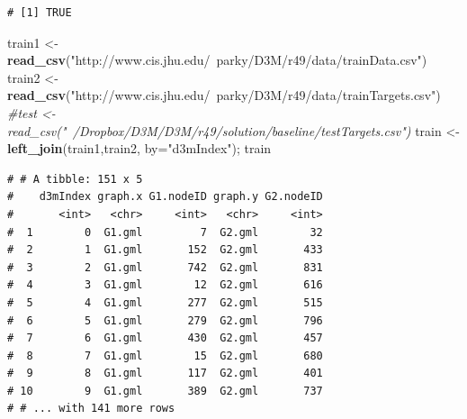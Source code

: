 \documentclass[]{article}
\newenvironment{Shaded}{\begin{snugshade}}{\end{snugshade}}
\newcommand{\KeywordTok}[1]{\textcolor[rgb]{0.13,0.29,0.53}{\textbf{#1}}}
\newcommand{\DataTypeTok}[1]{\textcolor[rgb]{0.13,0.29,0.53}{#1}}
\newcommand{\DecValTok}[1]{\textcolor[rgb]{0.00,0.00,0.81}{#1}}
\newcommand{\StringTok}[1]{\textcolor[rgb]{0.31,0.60,0.02}{#1}}
\newcommand{\CommentTok}[1]{\textcolor[rgb]{0.56,0.35,0.01}{\textit{#1}}}
\newcommand{\OperatorTok}[1]{\textcolor[rgb]{0.81,0.36,0.00}{\textbf{#1}}}
\newcommand{\NormalTok}[1]{#1}
\begin{document}
\begin{verbatim}
# [1] TRUE
\end{verbatim}

\begin{Shaded}
\end{Shaded}

\begin{Shaded}
\begin{Highlighting}[]
\NormalTok{train1 <-}\StringTok{ }\KeywordTok{read_csv}\NormalTok{(}\StringTok{"http://www.cis.jhu.edu/~parky/D3M/r49/data/trainData.csv"}\NormalTok{)}
\NormalTok{train2 <-}\StringTok{ }\KeywordTok{read_csv}\NormalTok{(}\StringTok{"http://www.cis.jhu.edu/~parky/D3M/r49/data/trainTargets.csv"}\NormalTok{)}
\CommentTok{#test <- read_csv("~/Dropbox/D3M/D3M/r49/solution/baseline/testTargets.csv")}
\NormalTok{train <-}\StringTok{ }\KeywordTok{left_join}\NormalTok{(train1,train2, }\DataTypeTok{by=}\StringTok{"d3mIndex"}\NormalTok{); train}
\end{Highlighting}
\end{Shaded}

\begin{verbatim}
# # A tibble: 151 x 5
#    d3mIndex graph.x G1.nodeID graph.y G2.nodeID
#       <int>   <chr>     <int>   <chr>     <int>
#  1        0  G1.gml         7  G2.gml        32
#  2        1  G1.gml       152  G2.gml       433
#  3        2  G1.gml       742  G2.gml       831
#  4        3  G1.gml        12  G2.gml       616
#  5        4  G1.gml       277  G2.gml       515
#  6        5  G1.gml       279  G2.gml       796
#  7        6  G1.gml       430  G2.gml       457
#  8        7  G1.gml        15  G2.gml       680
#  9        8  G1.gml       117  G2.gml       401
# 10        9  G1.gml       389  G2.gml       737
# # ... with 141 more rows
\end{verbatim}
\end{document}

